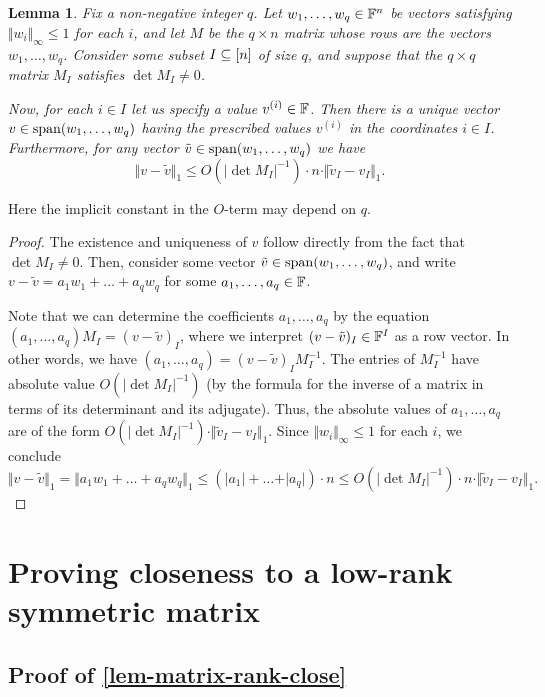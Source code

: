 \documentclass{daj}
\theoremstyle{plain}
\theoremstyle{plain}
\newtheorem{lem}[thm]{Lemma}
\theoremstyle{plain}
\theoremstyle{plain}
\theoremstyle{definition}
\theoremstyle{plain}
\theoremstyle{plain}
\theoremstyle{definition}
\theoremstyle{definition}
\theoremstyle{plain}
\begin{document}
\begin{lem}\label{claim-linear-comb-prescribed-entries}
Fix a non-negative integer $q$. Let $w_1,\dots,w_q\in \mathbb{F}^n$ be vectors satisfying $\Vert w_i\Vert_\infty\le 1$ for each $i$, and let $M$ be the $q\times n$ matrix whose rows are the vectors $w_1,\dots,w_q$. Consider some subset $I\subseteq [n]$ of size $q$, and suppose that the $q\times q$ matrix $M_I$ satisfies $\det M_I\ne 0$.

Now, for each $i\in I$ let us specify a value $v^{(i)}\in \mathbb{F}$. Then there is a unique vector $v\in \operatorname{span}(w_1,\dots,w_q)$ having the prescribed values $v^{(i)}$ in the coordinates $i\in I$. Furthermore, for any vector $\tilde{v}\in \operatorname{span}(w_1,\dots,w_q)$ we have
\[\Vert v-\tilde{v}\Vert_1\leq  O(|\det M_I|^{-1})\cdot n\cdot \Vert\tilde v_I-v_I\Vert_1.\]
\end{lem}

Here the implicit constant in the $O$-term may depend on $q$.

\begin{proof}
The existence and uniqueness of $v$ follow directly from the fact that $\det M_I\ne 0$. Then, consider some vector $\tilde{v}\in \operatorname{span}(w_1,\dots,w_q)$, and write $v-\tilde{v}=a_1w_1+\dots+a_qw_q$ for some $a_1,\dots,a_q\in \mathbb{F}$.

Note that we can determine the coefficients $a_1,\dots, a_q$ by the equation $(a_1,\dots,a_q)M_I=(v-\tilde{v})_I$, where we interpret $(v-\tilde{v})_I\in \mathbb{F}^I$ as a row vector. In other words, we have $(a_1,\dots,a_q)=(v-\tilde{v})_IM_I^{-1}$. The entries of $M_I^{-1}$ have absolute value $O(|\det M_I|^{-1})$ (by the formula for the inverse of a matrix in terms of its determinant and its adjugate). Thus, the absolute values of $a_1,\dots,a_q$ are of the form $O(|\det M_I|^{-1})\cdot \Vert\tilde v_I-v_I\Vert_1$. Since $\Vert w_i\Vert_\infty\le 1$ for each $i$, we conclude 
\[\Vert v-\tilde{v}\Vert_1=\Vert a_1w_1+\dots+a_qw_q\Vert_1\leq (\vert a_1\vert+\dots+\vert a_q\vert)\cdot n\leq  O(|\det M_I|^{-1})\cdot n\cdot \Vert\tilde v_I-v_I\Vert_1.\tag*{\qedhere}\]
\end{proof}

\section{Proving closeness to a low-rank symmetric matrix}\label{sec:lem-matrix-rank-close}

\subsection{Proof of \texorpdfstring{\cref{lem-matrix-rank-close}}{Lemma~\ref{lem-matrix-rank-close}}}
\end{document}
